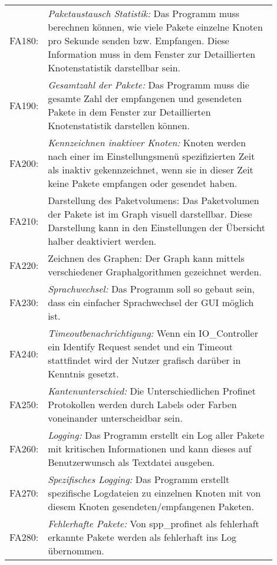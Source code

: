 \begin{longtable}{lp{0.9\linewidth}}
FA180: & \textit{Paketaustausch Statistik: }Das Programm muss berechnen können, wie viele Pakete einzelne Knoten pro Sekunde senden bzw. Empfangen. Diese Information muss in dem Fenster zur Detaillierten Knotenstatistik darstellbar sein. \\

FA190: & \textit{Gesamtzahl der Pakete: }Das Programm muss die gesamte Zahl der empfangenen und gesendeten Pakete in dem Fenster zur Detaillierten Knotenstatistik darstellen können. \\

FA200: & \textit{Kennzeichnen inaktiver Knoten: }Knoten werden nach einer im Einstellungsmenü spezifizierten Zeit als inaktiv gekennzeichnet, wenn sie in dieser Zeit keine Pakete empfangen oder gesendet haben. \\

FA210: & Darstellung des Paketvolumens: Das Paketvolumen der Pakete ist im Graph visuell darstellbar. Diese Darstellung kann in den Einstellungen der Übersicht halber deaktiviert werden. \\

FA220: & Zeichnen des Graphen: Der Graph kann mittels verschiedener Graphalgorithmen gezeichnet werden. \\

FA230: & \textit{Sprachwechsel: }Das Programm soll so gebaut sein, dass ein einfacher Sprachwechsel der GUI möglich ist. \\

FA240: & \textit{Timeoutbenachrichtigung: }Wenn ein IO\_Controller ein Identify Request sendet und ein Timeout stattfindet wird der Nutzer grafisch darüber in Kenntnis gesetzt. \\

FA250: & \textit{Kantenunterschied: }Die Unterschiedlichen Profinet Protokollen werden durch Labels oder Farben voneinander unterscheidbar sein. \\

FA260: & \textit{Logging: }Das Programm erstellt ein Log aller Pakete mit kritischen Informationen und kann dieses auf Benutzerwunsch als Textdatei ausgeben. \\

FA270: & \textit{Spezifisches Logging: }Das Programm erstellt spezifische Logdateien zu einzelnen Knoten mit von diesem Knoten gesendeten/empfangenen Paketen. \\

FA280: & \textit{Fehlerhafte Pakete: }Von spp\_profinet als fehlerhaft erkannte Pakete werden als fehlerhaft ins Log übernommen. 

\end{longtable}

